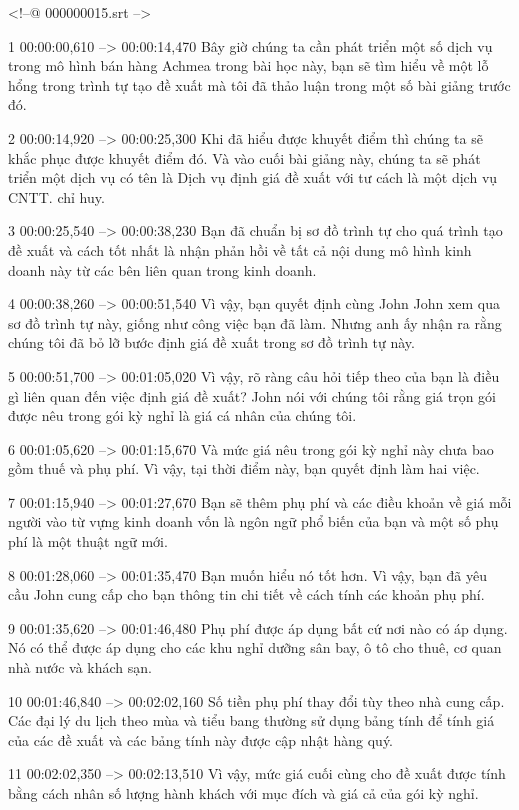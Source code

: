 <!--@ 000000015.srt -->

1
00:00:00,610 --> 00:00:14,470
Bây giờ chúng ta cần phát triển một số dịch vụ trong mô hình bán hàng Achmea trong bài học này, bạn sẽ tìm hiểu về một lỗ hổng trong trình tự tạo đề xuất mà tôi đã thảo luận trong một số bài giảng trước đó.

2
00:00:14,920 --> 00:00:25,300
Khi đã hiểu được khuyết điểm thì chúng ta sẽ khắc phục được khuyết điểm đó.  Và vào cuối bài giảng này, chúng ta sẽ phát triển một dịch vụ có tên là Dịch vụ định giá đề xuất với tư cách là một dịch vụ CNTT.  chỉ huy.

3
00:00:25,540 --> 00:00:38,230
Bạn đã chuẩn bị sơ đồ trình tự cho quá trình tạo đề xuất và cách tốt nhất là nhận phản hồi về tất cả nội dung mô hình kinh doanh này từ các bên liên quan trong kinh doanh.

4
00:00:38,260 --> 00:00:51,540
Vì vậy, bạn quyết định cùng John John xem qua sơ đồ trình tự này, giống như công việc bạn đã làm.  Nhưng anh ấy nhận ra rằng chúng tôi đã bỏ lỡ bước định giá đề xuất trong sơ đồ trình tự này.

5
00:00:51,700 --> 00:01:05,020
Vì vậy, rõ ràng câu hỏi tiếp theo của bạn là điều gì liên quan đến việc định giá đề xuất?  John nói với chúng tôi rằng giá trọn gói được nêu trong gói kỳ nghỉ là giá cá nhân của chúng tôi.

6
00:01:05,620 --> 00:01:15,670
Và mức giá nêu trong gói kỳ nghỉ này chưa bao gồm thuế và phụ phí.  Vì vậy, tại thời điểm này, bạn quyết định làm hai việc.

7
00:01:15,940 --> 00:01:27,670
Bạn sẽ thêm phụ phí và các điều khoản về giá mỗi người vào từ vựng kinh doanh vốn là ngôn ngữ phổ biến của bạn và một số phụ phí là một thuật ngữ mới.

8
00:01:28,060 --> 00:01:35,470
Bạn muốn hiểu nó tốt hơn.  Vì vậy, bạn đã yêu cầu John cung cấp cho bạn thông tin chi tiết về cách tính các khoản phụ phí.

9
00:01:35,620 --> 00:01:46,480
Phụ phí được áp dụng bất cứ nơi nào có áp dụng.  Nó có thể được áp dụng cho các khu nghỉ dưỡng sân bay, ô tô cho thuê, cơ quan nhà nước và khách sạn.

10
00:01:46,840 --> 00:02:02,160
Số tiền phụ phí thay đổi tùy theo nhà cung cấp.  Các đại lý du lịch theo mùa và tiểu bang thường sử dụng bảng tính để tính giá của các đề xuất và các bảng tính này được cập nhật hàng quý.

11
00:02:02,350 --> 00:02:13,510
Vì vậy, mức giá cuối cùng cho đề xuất được tính bằng cách nhân số lượng hành khách với mục đích và giá cả của gói kỳ nghỉ.

